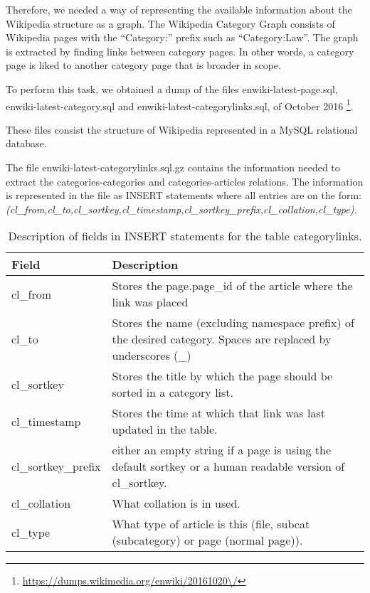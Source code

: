Therefore, we needed a way of representing the available information about the Wikipedia structure as a graph. The Wikipedia Category Graph consists of Wikipedia pages with the “Category:” prefix such as “Category:Law”. The graph is extracted by finding links between category pages. In other words, a category page is liked to another category page that is broader in scope.

To perform this task, we obtained a dump of the files enwiki-latest-page.sql, enwiki-latest-category.sql and enwiki-latest-categorylinks.sql, of October 2016 \footnote{\url{https://dumps.wikimedia.org/enwiki/20161020\/}}.

These files consist the structure of Wikipedia represented in a MySQL relational database.

The file enwiki-latest-categorylinks.sql.gz contains the information needed to extract the categories-categories and categories-articles relations. The information is represented in the file as INSERT statements where all entries are on the form: \\
\textit{
(cl\_from,cl\_to,cl\_sortkey,cl\_timestamp,cl\_sortkey\_prefix,cl\_collation,cl\_type). }



\begin{table}[H]
\begin{adjustbox}{width=1\textwidth}
\begin{tabular}{@{}ll@{}}
\toprule
Field               & Description                                                                                                   \\ \midrule
cl\_from            & Stores the page.page\_id of the article where the link was placed                                             \\
cl\_to              & Stores the name (excluding namespace prefix) of the desired category. Spaces are replaced by underscores (\_) \\
cl\_sortkey         & Stores the title by which the page should be sorted in a category list.                                       \\
cl\_timestamp       & Stores the time at which that link was last updated in the table.                                             \\
cl\_sortkey\_prefix & either an empty string if a page is using the default sortkey or a human readable version of cl\_sortkey.     \\
cl\_collation       & What collation is in used.                                                                                    \\
cl\_type            & What type of article is this (file, subcat (subcategory) or page (normal page)).                              \\ \bottomrule
\end{tabular}
\end{adjustbox}
\caption{Description of fields in INSERT statements for the table categorylinks.}
\label{tab:categorylinks}
\end{table}

